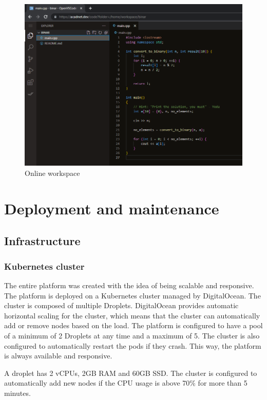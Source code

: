 \documentclass[12pt,a4paper]{report}
\begin{document}
\begin{figure}[h]
	\centering
	\includegraphics[width=\linewidth]{./pics/online-workspace.png}
	\caption{Online workspace}
	\label{fig:online-workspace}
\end{figure}


\chapter{Deployment and maintenance}
\section{Infrastructure}
\subsection{Kubernetes cluster}
The entire platform was created with the idea of being scalable and responsive. The platform is deployed on a Kubernetes cluster managed by DigitalOcean. The cluster is composed of multiple Droplets\protect\footnotemark{}. DigitalOcean provides automatic horizontal scaling for the cluster, which means that the cluster can automatically add or remove nodes based on the load. The platform is configured to have a pool of a minimum of 2 Droplets at any time and a maximum of 5. The cluster is also configured to automatically restart the pods if they crash. This way, the platform is always available and responsive.

A droplet has 2 vCPUs, 2GB RAM and 60GB SSD. The cluster is configured to automatically add new nodes if the CPU usage is above 70\% for more than 5 minutes. 
\end{document}
